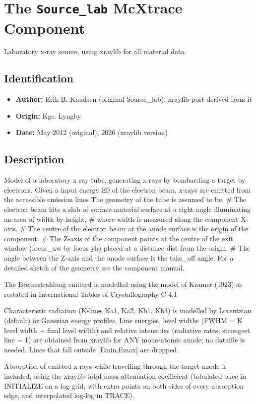 \section{The \texttt{Source\_lab} McXtrace Component}
Laboratory x-ray source, using xraylib for all material data.

\subsection*{Identification}
\begin{itemize}
  \item \textbf{Author:} Erik B. Knudsen (original Source\_lab), xraylib port derived from it
  \item \textbf{Origin:} Kgs. Lyngby
  \item \textbf{Date:} May 2012 (original), 2026 (xraylib version)
\end{itemize}

\subsection*{Description}
Model of a laboratory x-ray tube, generating x-rays by bombarding a target by electrons. Given a input energy E0 of the electron beam, x-rays are emitted from the accessible emission lines The geometry of the tube is assumed to be: \# The electron beam hits a slab of surface material surface at a right angle illuminating an area of width by height, \# where width is measured along the component X-axis. \# The centre of the electron beam at the anode surface is the origin of the component. \# The Z-axis of the component points at the centre of the exit window (focus\_xw by focus yh) placed at a distance dist from the origin. \# The angle between the Z-axis and the anode surface is the take\_off angle. For a detailed sketch of the geometry see the component manual.

The Bremsstrahlung emitted is modelled using the model of Kramer (1923) as restated in International Tables of Crystallography C 4.1

Characteristic radiation (K-lines Ka1, Ka2, Kb1, Kb3) is modelled by Lorentzian (default) or Gaussian energy profiles. Line energies, level widths (FWHM = K level width + final level width) and relative intensities (radiative rates, strongest line = 1) are obtained from xraylib for ANY mono-atomic anode; no datafile is needed. Lines that fall outside [Emin,Emax] are dropped.

Absorption of emitted x-rays while travelling through the target anode is included, using the xraylib total mass attenuation coefficient (tabulated once in INITIALIZE on a log grid, with extra points on both sides of every absorption edge, and interpolated log-log in TRACE).

